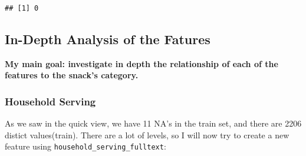 \documentclass[
]{article}
\begin{document}
\begin{verbatim}
## [1] 0
\end{verbatim}

\hypertarget{in-depth-analysis-of-the-fatures}{%
\subsection{In-Depth Analysis of the
Fatures}\label{in-depth-analysis-of-the-fatures}}

\textbf{My main goal: investigate in depth the relationship of each of
the features to the snack's category.}

\hypertarget{household-serving}{%
\subsubsection{Household Serving}\label{household-serving}}

As we saw in the quick view, we have 11 NA's in the train set, and there
are 2206 distict values(train). There are a lot of levels, so I will now
try to create a new feature using \texttt{household\_serving\_fulltext}:
\end{document}

